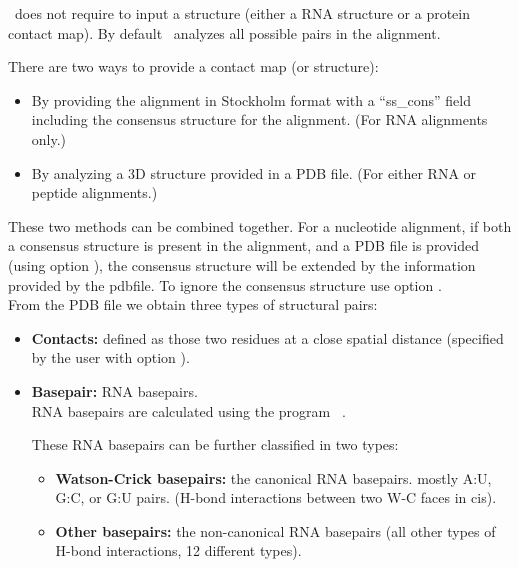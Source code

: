 \rscape\ does not require to input a structure (either a RNA structure
or a protein contact map). By default \rscape\ analyzes all possible
pairs in the alignment.
\vspace{1mm}

\noindent
There are two ways to provide a contact map (or structure):

\begin{itemize}

\item By providing the alignment in Stockholm format with a ``ss\_cons'' field including the consensus
structure for the alignment. (For RNA alignments only.)

\item By analyzing a 3D structure provided in a PDB file. (For either RNA or peptide alignments.)\\
\end{itemize}

\noindent
These two methods can be combined together. For a nucleotide
alignment, if both a consensus structure is present in the alignment,
and a PDB file is provided (using option ), the
consensus structure will be extended by the information provided by
the pdbfile.  To ignore the consensus structure use
option .\\


\noindent
From the PDB file we obtain three types of structural pairs:

\begin{itemize}
\item \textbf{Contacts:} defined as those two residues at a close spatial distance (specified by the user with option ).
\item \textbf{Basepair:} RNA basepairs. \\
RNA basepairs are calculated using the program ~\citep{YangWesthof03}.

These RNA basepairs can be further classified in two types:
\begin{itemize}
\item \textbf{Watson-Crick basepairs:} the canonical RNA basepairs. mostly A:U, G:C, or G:U pairs. (H-bond interactions between two W-C faces in cis).
\item \textbf{Other basepairs:} the non-canonical RNA basepairs (all other types of H-bond interactions, 12 different types).
\end{itemize}
\end{itemize}


